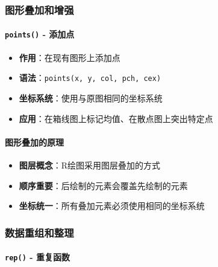 \documentclass[
  twoside]{book}
\providecommand{\tightlist}{%
  \setlength{\itemsep}{0pt}\setlength{\parskip}{0pt}}
\begin{document}
\hypertarget{ux56feux5f62ux53e0ux52a0ux548cux589eux5f3a}{%
\subsubsection{图形叠加和增强}\label{ux56feux5f62ux53e0ux52a0ux548cux589eux5f3a}}

\hypertarget{points---ux6dfbux52a0ux70b9}{%
\paragraph{\texorpdfstring{\texttt{points()} - 添加点}{points() - 添加点}}\label{points---ux6dfbux52a0ux70b9}}

\begin{itemize}
\tightlist
\item
  \textbf{作用}：在现有图形上添加点
\item
  \textbf{语法}：\texttt{points(x,\ y,\ col,\ pch,\ cex)}
\item
  \textbf{坐标系统}：使用与原图相同的坐标系统
\item
  \textbf{应用}：在箱线图上标记均值、在散点图上突出特定点
\end{itemize}

\hypertarget{ux56feux5f62ux53e0ux52a0ux7684ux539fux7406}{%
\paragraph{图形叠加的原理}\label{ux56feux5f62ux53e0ux52a0ux7684ux539fux7406}}

\begin{itemize}
\tightlist
\item
  \textbf{图层概念}：R绘图采用图层叠加的方式
\item
  \textbf{顺序重要}：后绘制的元素会覆盖先绘制的元素
\item
  \textbf{坐标统一}：所有叠加元素必须使用相同的坐标系统
\end{itemize}

\hypertarget{ux6570ux636eux91cdux7ec4ux548cux6574ux7406}{%
\subsubsection{数据重组和整理}\label{ux6570ux636eux91cdux7ec4ux548cux6574ux7406}}

\hypertarget{rep---ux91cdux590dux51fdux6570}{%
\paragraph{\texorpdfstring{\texttt{rep()} - 重复函数}{rep() - 重复函数}}\label{rep---ux91cdux590dux51fdux6570}}
\end{document}

